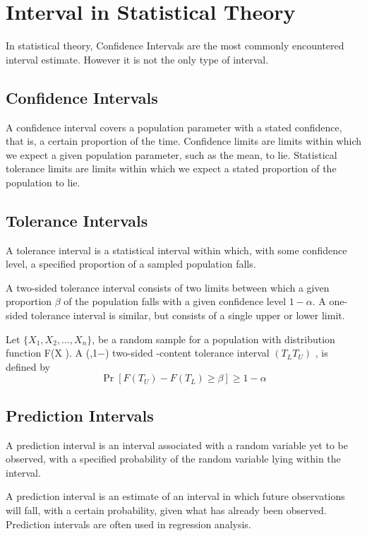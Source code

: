 \section{Interval in Statistical Theory}
In statistical theory, Confidence Intervals are the most commonly encountered interval estimate. However it is not the only type of interval.


\subsection{Confidence Intervals}
A confidence interval covers a population parameter with a stated confidence, that is, a certain proportion of the time.
Confidence limits are limits within which we expect a given population parameter, such as the mean, to lie. Statistical tolerance limits are limits within which we expect a stated proportion of the population to lie.

\subsection{Tolerance Intervals}
A tolerance interval is a statistical interval within which, with some confidence level, a specified proportion of a sampled population falls.

A two-sided tolerance interval consists of two limits between which a given proportion $\beta$ of the population falls with a given confidence
level $1−\alpha$. A one-sided tolerance interval is similar, but consists of a single upper or lower limit.


Let $\{X_1, X_2, \ldots , X_n  \}$, be a random sample for a population with distribution function F(X ). A (\beta,1−\alpha) two-sided
\beta -content tolerance interval $(T_L T_U ) $ , is defined by
\[ \Pr[F(T_U ) − F(T_L ) \geq \beta ] ≥ 1−\alpha\]


\subsection{Prediction Intervals}
A prediction interval is an interval associated with a random variable yet to be observed, with a specified probability of the random variable lying within the interval. 

A prediction interval is an estimate of an interval in which future observations will fall, with a certain probability, given what has already been observed. Prediction intervals are often used in regression analysis.

